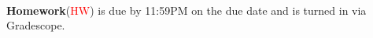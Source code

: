 \documentclass[11pt,fleqn]{article}
\begin{document}
\vspace*{-0.7in}

\begin{center}
  {\large{
  }}\\
\end{center}

 \textbf{Homework}(\textcolor{red}{HW}) is due by 11:59PM on the due date and is turned in via Gradescope.\\
\end{document}
